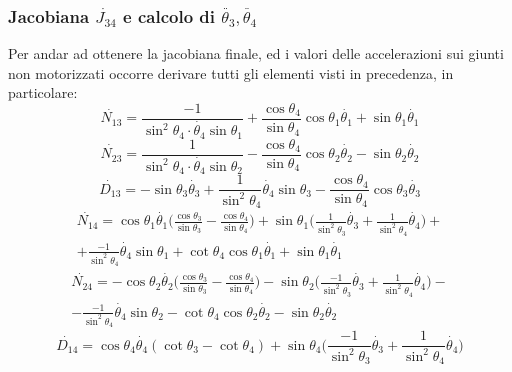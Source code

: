 \subsubsection{Jacobiana $\dot{J_{34}}$ e calcolo di $\ddot{\theta_3}, \ddot{\theta_4}$}
Per andar ad ottenere la jacobiana finale, ed i valori delle accelerazioni sui giunti non motorizzati occorre derivare tutti gli elementi visti in precedenza, in particolare:
\begin{equation*} %
    \dot{N_{13}} = \frac{-1}{\sin^2\theta_4\cdot\dot{\theta_4}\sin\theta_1}+\frac{\cos\theta_4}{\sin\theta_4}\cos\theta_1\dot{\theta_1}+\sin\theta_1\dot{\theta_1}
\end{equation*}
\begin{equation*} %
   \dot{N_{23}} =\frac{1}{\sin^2\theta_4\cdot\dot{\theta_4}\sin\theta_2}-\frac{\cos\theta_4}{\sin\theta_4}\cos\theta_2\dot{\theta_2}-\sin\theta_2\dot{\theta_2}
\end{equation*}
\begin{equation*} %
  \dot{D_{13}} =  -\sin\theta_3\dot{\theta_3} + \frac{1}{\sin^2\theta_4}\dot{\theta_4}\sin\theta_3 -\frac{ \cos\theta_4} {\sin\theta_4}\cos\theta_3\dot{\theta_3}
\end{equation*}
\begin{equation*} %
\begin{aligned}
    \dot{N_{14}} = \cos\theta_1\dot{\theta_1}\bigg(\frac{\cos\theta_3}{\sin\theta_3}-\frac{\cos\theta_4}{\sin\theta_4}\bigg) + \sin\theta_1\bigg(\frac{1}{\sin^2\theta_3}\dot{\theta_3}+\frac{1}{\sin^2\theta_4}\dot{\theta_4}\bigg)+\\+\frac{-1}{\sin^2\theta_4}\dot{\theta_4}\sin\theta_1 +\cot\theta_4\cos\theta_1\dot{\theta_1}+\sin\theta_1\dot{\theta_1}
    \end{aligned}
\end{equation*}
\begin{equation*} %
    \begin{aligned}
    \dot{N_{24}} = -\cos\theta_2\dot{\theta_2}\bigg(\frac{\cos\theta_3}{\sin\theta_3} - \frac{\cos\theta_4}{\sin\theta_4} \bigg) - \sin\theta_2\bigg(\frac{-1}{\sin^2\theta_3}\dot{\theta_3} + \frac{1}{\sin^2\theta_4}\dot{\theta_4}\bigg) -\\
    - \frac{-1}{\sin^2\theta_4}\dot{\theta_4}\sin\theta_2-\cot\theta_4\cos\theta_2\dot{\theta_2}-\sin\theta_2\dot{\theta_2}
    \end{aligned}
\end{equation*}
\begin{equation*} %
   \dot{D_{14}} = \cos\theta_4\dot{\theta_4}(\cot\theta_3-\cot\theta_4)+\sin\theta_4\bigg(\frac{-1}{\sin^2\theta_3}\dot{\theta_3} + \frac{1}{\sin^2\theta_4}\dot{\theta_4}\bigg)
\end{equation*}
